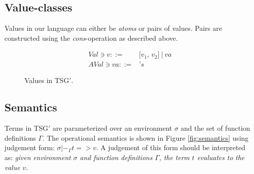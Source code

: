 \documentclass[10pt]{../sigplanconf}
\begin{document}
\subsection{Value-classes}


Values in our language can either be \textit{atoms} or pairs of
values. Pairs are constructed using the \textit{cons}-operation as
described above.

\begin{figure}\centering
  \begin{align*}
    Val \ni v ::= & \texttt{[$v_1$, $v_2$]}\ |\ va\\
    AVal \ni va ::= & \texttt{'}s
  \end{align*}
  \caption{Values in TSG$'$.}
\label{fig:bnf}
\end{figure}

\subsection{Semantics}
Terms in TSG$'$ are parameterized over an environment $\sigma$ and
the set of function definitions $\Gamma$. The operational semantics is
shown in Figure \ref{fig:semantics} using judgement form: $\sigma
|-_\Gamma t => v$. A judgement of this form should be interpreted as:
\textit{given environment $\sigma$ and function definitions $\Gamma$,
  the term $t$ evaluates to the value $v$.}
\end{document}
